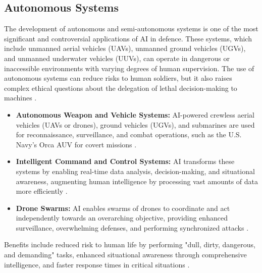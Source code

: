 \subsection{Autonomous Systems}
The development of autonomous and semi-autonomous systems is one of the most significant and controversial applications of AI in defence. These systems, which include unmanned aerial vehicles (UAVs), unmanned ground vehicles (UGVs), and unmanned underwater vehicles (UUVs), can operate in dangerous or inaccessible environments with varying degrees of human supervision. The use of autonomous systems can reduce risks to human soldiers, but it also raises complex ethical questions about the delegation of lethal decision-making to machines \cite{dignum2019responsible}.
\begin{itemize}
    \item \textbf{Autonomous Weapon and Vehicle Systems:} AI-powered crewless aerial vehicles (UAVs or drones), ground vehicles (UGVs), and submarines are used for reconnaissance, surveillance, and combat operations, such as the U.S. Navy's Orca AUV for covert missions \cite{SDIAI_AutonomousSystems, DigitalDefynd_AutonomousSystems}.
    \item \textbf{Intelligent Command and Control Systems:} AI transforms these systems by enabling real-time data analysis, decision-making, and situational awareness, augmenting human intelligence by processing vast amounts of data more efficiently \cite{FlySight_AutonomousSystems}.
    \item \textbf{Drone Swarms:} AI enables swarms of drones to coordinate and act independently towards an overarching objective, providing enhanced surveillance, overwhelming defenses, and performing synchronized attacks \cite{Medium_AutonomousSystems}.
\end{itemize}
Benefits include reduced risk to human life by performing "dull, dirty, dangerous, and demanding" tasks, enhanced situational awareness through comprehensive intelligence, and faster response times in critical situations \cite{ResearchGate_AutonomousSystems, Forbes_AutonomousSystems}.

